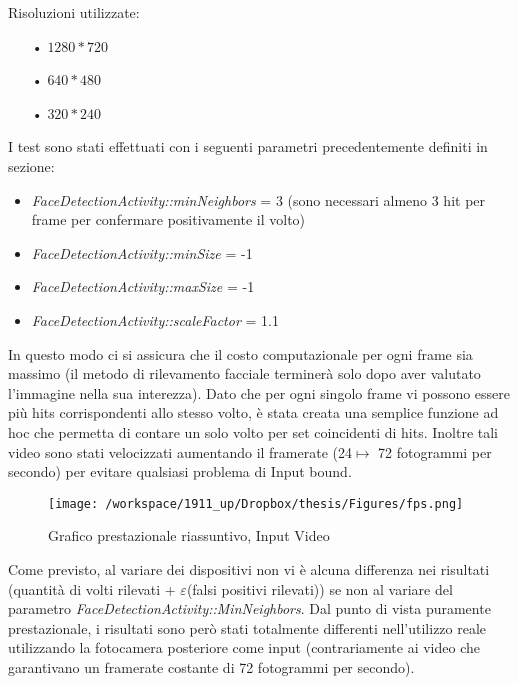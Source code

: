 Risoluzioni utilizzate:

\begin{itemize}
\item[•] $1280\ast720$ 
\item[•] $640\ast480$ 
\item[•] $320\ast240$ 
\end{itemize}

I test sono stati effettuati con i seguenti parametri precedentemente definiti in sezione:
\begin{itemize}
\item \textit{FaceDetectionActivity::minNeighbors} = 3 (sono necessari almeno 3 hit per frame per confermare positivamente il volto)
\item \textit{FaceDetectionActivity::minSize} = -1  
\item \textit{FaceDetectionActivity::maxSize} = -1
\item \textit{FaceDetectionActivity::scaleFactor} = 1.1 
\end{itemize}

In questo modo ci si assicura che il costo computazionale per ogni frame sia massimo (il metodo di rilevamento facciale terminerà solo dopo aver valutato l'immagine nella sua interezza). 
Dato che per ogni singolo frame vi possono essere più hits corrispondenti allo stesso volto, è stata creata una semplice funzione ad hoc che permetta di contare un solo volto per set coincidenti di hits. Inoltre tali video sono stati velocizzati aumentando il framerate (24$\longmapsto$ 72 fotogrammi per secondo) per evitare qualsiasi problema di Input bound.
\\

\begin{figure}[H]\centering  
\texttt{[image: /workspace/1911\_up/Dropbox/thesis/Figures/fps.png]}
\caption[Grafico prestazionale riassuntivo, Input Video]{Grafico prestazionale riassuntivo, Input Video}
\label{pic-a}
\end{figure}

Come previsto, al variare dei dispositivi non vi è alcuna differenza nei risultati (quantità di volti rilevati + $\varepsilon$(falsi positivi rilevati)) se non al variare del parametro \textit{FaceDetectionActivity::MinNeighbors}. Dal punto di vista puramente prestazionale, i risultati sono però stati totalmente differenti nell'utilizzo reale utilizzando la fotocamera posteriore come input (contrariamente ai video che garantivano un framerate costante di 72 fotogrammi per secondo). 



